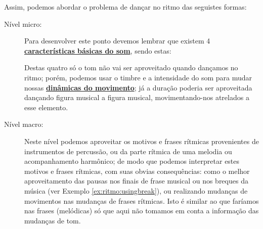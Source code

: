 Assim, podemos abordar o problema de dançar no ritmo das seguistes formas:
\begin{description}
\item [Nível micro:] Para desenvolver este ponto devemos lembrar 
que existem 4 \hyperref[sec:carateristasom]{\textbf{características básicas do som}},
sendo estas: 
Destas quatro só o tom não vai ser aproveitado quando dançamos no ritmo;
porém, podemos usar o timbre e a intensidade do som para mudar nossas 
\hyperref[sec:musicalidade:dinamicas]{\textbf{dinâmicas do movimento}};
já a duração poderia ser aproveitada dançando figura musical a figura musical,
movimentando-nos atrelados a esse elemento. 


\item [Nível macro:] Neste nível podemos aproveitar os  motivos e frases rítmicas
provenientes de instrumentos de percussão, ou da parte rítmica de uma melodia ou acompanhamento harmônico;
de modo que podemos interpretar estes motivos e frases rítmicas, 
com suas obvias consequências: como o melhor aproveitamento das pausas 
nos finais de frase musical ou nos breques da música (ver Exemplo \ref{ex:ritmo:usingbreak}),
ou realizando mudanças de movimentos nas mudanças de frases rítmicas.
Isto é similar ao que faríamos nas frases (melódicas) só que aqui 
não tomamos em conta a informação das mudanças de tom.
\end{description}


